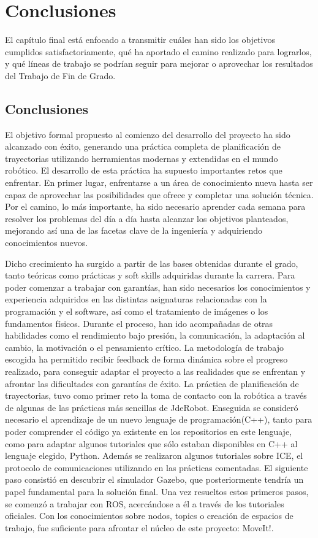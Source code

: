 \documentclass[12pt,spanish,chapterprefix, numbers=noenddot]{book}
\numberwithin{equation}{section}
\numberwithin{figure}{section}
\begin{document}
\chapter{Conclusiones}
El capítulo final está enfocado a transmitir cuáles han sido los objetivos cumplidos satisfactoriamente, qué ha aportado el camino realizado para lograrlos, y qué líneas de trabajo se podrían seguir para mejorar o aprovechar los resultados del Trabajo de Fin de Grado.  
\section{Conclusiones}
El objetivo formal propuesto al comienzo del desarrollo del proyecto ha sido alcanzado con éxito, generando una práctica completa de planificación de trayectorias utilizando herramientas modernas y extendidas en el mundo robótico. El desarrollo de esta práctica ha supuesto importantes retos que enfrentar. En primer lugar, enfrentarse a un área de conocimiento nueva hasta ser capaz de aprovechar las posibilidades que ofrece y completar una solución técnica. Por el camino, lo más importante, ha sido necesario aprender cada semana para resolver los problemas del día a día hasta alcanzar los objetivos planteados, mejorando así una de las facetas clave de la ingeniería y adquiriendo conocimientos nuevos. 

Dicho crecimiento ha surgido a partir de las bases obtenidas durante el grado, tanto teóricas como prácticas y soft skills adquiridas durante la carrera. Para poder comenzar a trabajar con garantías, han sido necesarios los conocimientos y experiencia adquiridos en las distintas asignaturas relacionadas con la programación y el software, así como el tratamiento de imágenes o los fundamentos físicos. Durante el proceso, han ido acompañadas de otras habilidades como el rendimiento bajo presión, la comunicación, la adaptación al cambio, la motivación o el pensamiento crítico. La metodología de trabajo escogida ha permitido recibir feedback de forma dinámica sobre el progreso realizado, para conseguir adaptar el proyecto a las realidades que se enfrentan y afrontar las dificultades con garantías de éxito.
La práctica de planificación de trayectorias, tuvo como primer reto la toma de contacto con la robótica a través de algunas de las prácticas más sencillas de JdeRobot. Enseguida se consideró necesario el aprendizaje de un nuevo lenguaje de programación(C++), tanto para poder comprender el código ya existente en los repositorios en este lenguaje, como para adaptar algunos tutoriales que sólo estaban disponibles en C++ al lenguaje elegido, Python. Además se realizaron algunos tutoriales sobre ICE, el protocolo de comunicaciones utilizando en las prácticas comentadas. El siguiente paso consistió en descubrir el simulador Gazebo, que posteriormente tendría un papel fundamental para la solución final. Una vez resueltos estos primeros pasos, se comenzó a trabajar con ROS, acercándose a él a través de los tutoriales oficiales. Con los conocimientos sobre nodos, topics o creación de espacios de trabajo, fue suficiente para afrontar el núcleo de este proyecto: MoveIt!. 
\end{document}
